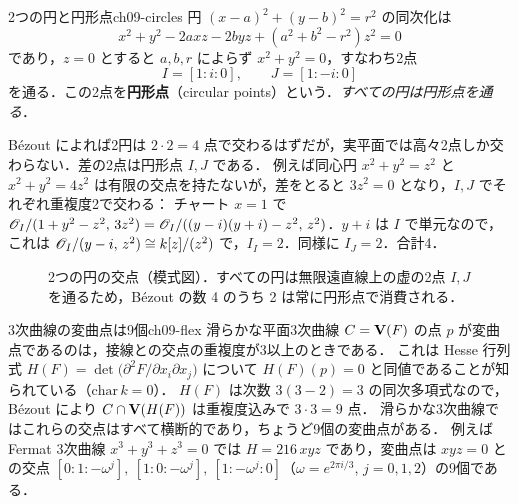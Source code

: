 \begin{myex}{2つの円と円形点}{ch09-circles}
円 $(x-a)^2+(y-b)^2=r^2$ の同次化は
\[
  x^2+y^2-2axz-2byz+(a^2+b^2-r^2)z^2=0
\]
であり，$z=0$ とすると $a,b,r$ によらず $x^2+y^2=0$，すなわち2点
\[
  I=[1:i:0],\qquad J=[1:-i:0]
\]
を通る．この2点を\textbf{円形点}（circular points）という．\emph{すべての円は円形点を通る}．

B\'ezout によれば2円は $2\cdot2=4$ 点で交わるはずだが，実平面では高々2点しか交わらない．差の2点は円形点 $I,J$ である．
例えば同心円 $x^2+y^2=z^2$ と $x^2+y^2=4z^2$ は有限の交点を持たないが，差をとると $3z^2=0$ となり，$I,J$ でそれぞれ重複度2で交わる：
チャート $x=1$ で $\mathscr{O}_I/(1+y^2-z^2,\,3z^2)=\mathscr{O}_I/((y-i)(y+i)-z^2,\,z^2)$．$y+i$ は $I$ で単元なので，これは $\mathscr{O}_I/(y-i,\,z^2)\cong k[z]/(z^2)$ で，$I_I=2$．同様に $I_J=2$．合計4．
\end{myex}

\begin{figure}[htbp]
\centering
{}
\caption{2つの円の交点（模式図）．すべての円は無限遠直線上の虚の2点 $I,J$ を通るため，B\'ezout の数 4 のうち 2 は常に円形点で消費される．}
\label{fig:ch09-circles}
\end{figure}

\begin{myex}{3次曲線の変曲点は9個}{ch09-flex}
滑らかな平面3次曲線 $C=\mathbf{V}(F)$ の点 $p$ が変曲点であるのは，接線との交点の重複度が3以上のときである．
これは Hesse 行列式 $H(F)=\det\bigl(\partial^2F/\partial x_i\partial x_j\bigr)$ について $H(F)(p)=0$ と同値であることが知られている（$\mathrm{char}\,k=0$）．
$H(F)$ は次数 $3(3-2)=3$ の同次多項式なので，B\'ezout により $C\cap\mathbf{V}(H(F))$ は重複度込みで $3\cdot3=9$ 点．
滑らかな3次曲線ではこれらの交点はすべて横断的であり，ちょうど9個の変曲点がある．
例えば Fermat 3次曲線 $x^3+y^3+z^3=0$ では $H=216\,xyz$ であり，変曲点は $xyz=0$ との交点
$[0:1:-\omega^j],\ [1:0:-\omega^j],\ [1:-\omega^j:0]$（$\omega=e^{2\pi i/3}$, $j=0,1,2$）の9個である．
\end{myex}

